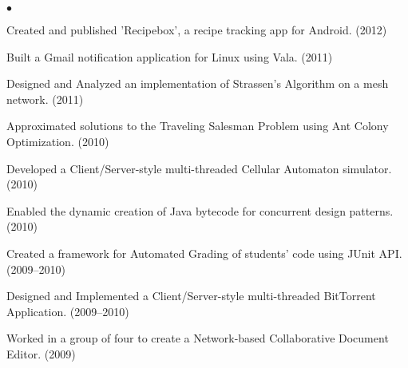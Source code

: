 \documentclass{article}
\newcommand{\lineunder} {
	\vspace*{-8pt} \\ \hspace*{-18pt} \hrulefill \\
}
\newcommand{\header}[1] {
	{\hspace*{-15pt}\vspace*{6pt} \textsc{#1}} \vspace*{-6pt} \lineunder
}
\newenvironment{achievements} {
	\begin{list}{$\bullet$}
		{\topsep 0pt \itemsep -2pt}
	}{
		\vspace*{4pt}\end{list}
	}
\begin{document}
	\begin{achievements}
		\item{Created and published 'Recipebox', a recipe tracking app for Android. (2012)}
		\item{Built a Gmail notification application for Linux using Vala. (2011)}
		\item{Designed and Analyzed an implementation of Strassen's Algorithm on a mesh network. (2011)}
		\item{Approximated solutions to the Traveling Salesman Problem using Ant Colony Optimization. (2010)}
		\item{Developed a Client/Server-style multi-threaded Cellular Automaton simulator. (2010)}
		\item{Enabled the dynamic creation of Java bytecode for concurrent design patterns. (2010)}
		\item{Created a framework for Automated Grading of students' code using JUnit API. (2009--2010)}
		\item{Designed and Implemented a Client/Server-style multi-threaded BitTorrent Application. (2009--2010)}
		\item{Worked in a group of four to create a Network-based Collaborative Document Editor. (2009)}
	\end{achievements}

\end{document}
